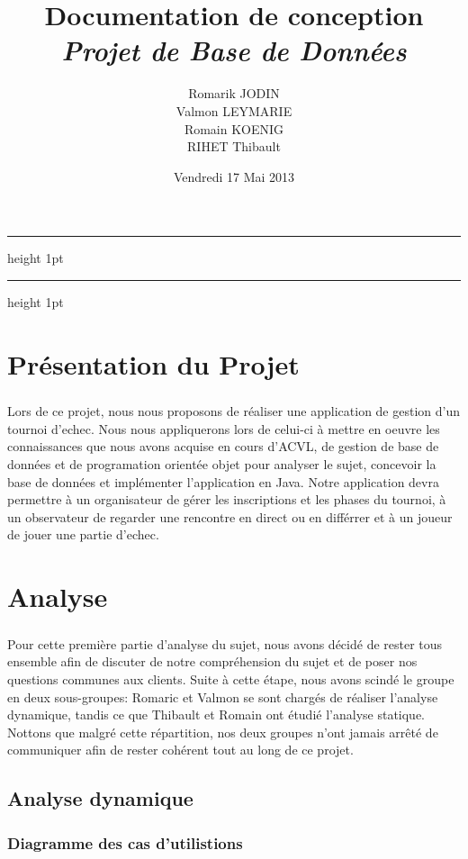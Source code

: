 \documentclass[10pt,a4paper]{report}
\title{Documentation de conception\\
{\em Projet de Base de Données}}
\author{Romarik JODIN\\ Valmon LEYMARIE\\ Romain KOENIG\\ RIHET Thibault}
\date{Vendredi 17 Mai 2013}
\makeatletter
\def\thickhrulefill{\leavevmode \leaders \hrule height 1pt\hfill \kern \z@}
\def\maketitle{%
  \thispagestyle{empty}%
  \begin{center}
  \begin{flushleft}
  \normalfont\LARGE \par
	  \end{flushleft}
	\vskip 4.5cm
	  \leavevmode
	  \normalfont
	  \thickhrulefill\par
	  \vskip 0.2cm
	  {\huge\@title\par}%
	  \vskip 0.1cm
  \thickhrulefill\par
	  \vskip 1cm
	  {\Large \@date\par}%
  \vskip 12cm
  {\Large \@author\par}%
  \end{center}%
	  \clearpage
}
\makeatother
\begin{document}
\maketitle
\newpage
\tableofcontents
\newpage


\chapter*{Présentation du Projet}
\paragraph{}Lors de ce projet, nous nous proposons de réaliser une application de gestion d'un tournoi d'echec. Nous nous appliquerons lors de celui-ci à mettre en oeuvre les connaissances que nous avons acquise en cours d'ACVL, de gestion de base de données et de programation orientée objet pour analyser le sujet, concevoir la base de données et implémenter l'application en Java. 
\mbox{}\hspace{0.4cm}Notre application devra permettre à un organisateur de gérer les inscriptions et les phases du tournoi, à un observateur de regarder une rencontre en direct ou en différrer et à un joueur de jouer une partie d'echec.
\chapter{Analyse}
\paragraph{}Pour cette première partie d'analyse du sujet, nous avons décidé de rester tous ensemble afin de discuter de notre compréhension du sujet et de poser nos questions communes aux clients. Suite à cette étape, nous avons scindé le groupe en deux sous-groupes: Romaric et Valmon se sont chargés de réaliser l'analyse dynamique, tandis ce que Thibault et Romain ont étudié l'analyse statique.\\
\mbox{}\hspace{0.4cm}Nottons que malgré cette répartition, nos deux groupes n'ont jamais arrêté de communiquer afin de rester cohérent tout au long de ce projet.
\section{Analyse dynamique}
\subsection{Diagramme des cas d'utilistions}
\end{document}
